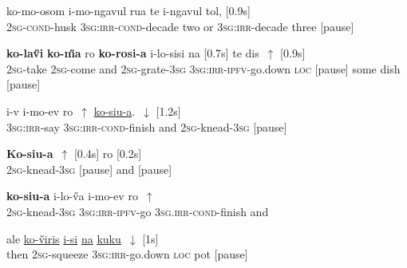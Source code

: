 \documentclass[output=paper]{LSP/langsci}
\begin{document}
  \begin{exe}
 \label{Guapp7}
\gll    ko-mo-osom       i-mo-ngavul                rua   te     i-ngavul    tol, [0.9s]\\     	       
 \textsc{2sg}-\textsc{cond}-husk   \textsc{3sg:irr-cond}-decade   two   or     \textsc{3sg:irr}-decade    three [pause]\\
\glt {} 
\end{exe}

  \begin{exe}
 \label{Guapp8}
\gll    \textbf{ko-la\H{v}i}      \textbf{ko-\H{m}a} ro      \textbf{ko-rosi-a}  i-lo-sisi                 na  [0.7s] te dis~$\uparrow$ [0.9s]\\     	       
 \textsc{2sg}-take   \textsc{2sg}-come  and \textsc{2sg}-grate-\textsc{3sg} \textsc{3sg:irr-ipfv}-go.down   \textsc{loc} [pause] some dish [pause]\\
\glt {} 
\end{exe}

  \begin{exe}
 \label{Guapp9}
\gll  i-v             i-mo-ev                  ro~$\uparrow$     \underline{ko-siu-a}.~$\downarrow$  [1.2s]  \\     	       
 \textsc{3sg:irr}-say   \textsc{3sg:irr-cond}-finish   and   \textsc{2sg}-knead-\textsc{3sg}  [pause]\\
\glt {} 
\end{exe}

  \begin{exe}
 \label{Guapp10}
\gll  \textbf{Ko-siu-a}~$\uparrow$  [0.4s] ro [0.2s] \\     	       
\textsc{2sg}-knead-\textsc{3sg} [pause]  and [pause]\\
\glt {} 
\end{exe}


  \begin{exe}
 \label{Guapp11}
\gll  \textbf{ko-siu-a} i-lo-\H{v}a                  i-mo-ev                  ro~$\uparrow$   \\     
\textsc{2sg}-knead-\textsc{3sg} \textsc{3sg:irr-ipfv}-go     \textsc{3sg.irr-cond}-finish   and  \\
\glt {} 
\end{exe}

\begin{exe}
 \label{Guapp12}
\gll  ale    \underline{ko-\H{v}iris}          \underline{i-si}                 \underline{na}   \underline{kuku}~$\downarrow$  [1s]\\     	       
then   \textsc{2sg}-squeeze     \textsc{3sg:irr-}go.down   \textsc{loc}  pot  [pause]\\
\glt {} 
\end{exe}
\end{document}

